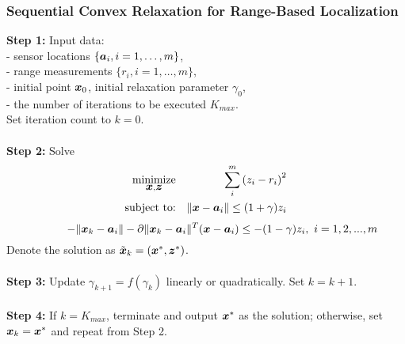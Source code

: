 \begin{frame} [t,allowframebreaks]
\frametitle{Sequential Convex Relaxation for Range-Based Localization}
\phantom{m}
\textbf{Step 1:} Input data: \\
- sensor locations $\{\mbox{\boldmath$a$}_i,  i=1,\ldots,m\}$, \\
- range measurements $\{r_i, i=1,\ldots,m\}$, \\
- initial point $\mbox{\boldmath$x$}_0$, initial relaxation parameter $\gamma_0$, \\
- the number of iterations to be executed $K_{max}$. %
\\ Set iteration count to $k = 0$.
\\~\\
\phantom{m}
\phantom{m}
\textbf{Step 2:} Solve
\begin{eqnarray} 
\nonumber
\mathop{\mbox{minimize}}_{\mbox{\boldmath$x$}, \mbox{\boldmath$z$}}& &\sum^m_i \left( z_i - r_i \right)^2 \\
\nonumber
\mbox{subject to:}& &\|\mbox{\boldmath$x$} - \mbox{\boldmath$a$}_i\|  \leq  (1+ \gamma)z_i  
\end{eqnarray}
\begin{equation}
\nonumber
\qquad \quad   -\|\mbox{\boldmath$x$}_k - \mbox{\boldmath$a$}_i\| - \partial\|\mbox{\boldmath$x$}_k -\mbox{\boldmath$a$}_i\|^T(\mbox{\boldmath$x$} - \mbox{\boldmath$a$}_i)  \leq  -(1 - \gamma)z_i, \ i = 1, 2, ..., m
\end{equation}
\noindent
Denote the solution as $\tilde{\mbox{\boldmath$x$}}_k = (\mbox{\boldmath$x$}^*, \mbox{\boldmath$z$}^*)$. 
\\~\\
\textbf{Step 3:} Update  $\gamma_{k+1} = f(\gamma_k)$ linearly or quadratically. Set $k = k+1$. 
\\~\\
\textbf{Step 4:} If $k = K_{max}$, terminate and output $\mbox{\boldmath$x$}^*$ as the solution; otherwise, set $\mbox{\boldmath$x$}_{k} = \mbox{\boldmath$x$}^{*}$  and repeat from Step 2. 
\end{frame}



